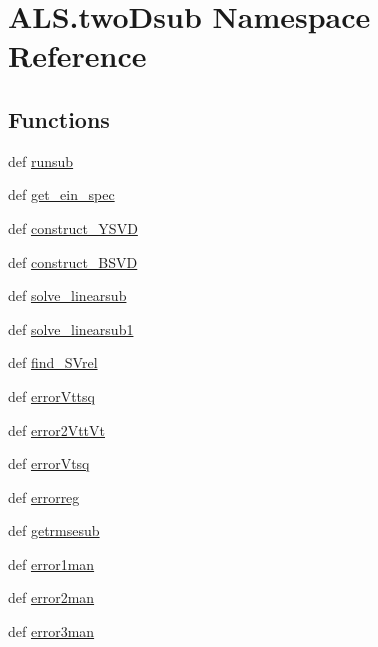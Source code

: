 \hypertarget{namespace_a_l_s_1_1two_dsub}{\section{A\+L\+S.\+two\+Dsub Namespace Reference}
\label{namespace_a_l_s_1_1two_dsub}
}
\subsection*{Functions}
\begin{DoxyCompactItemize}
\item 
def \hyperlink{namespace_a_l_s_1_1two_dsub_a2f5605fed0568b72d992d8e6cea524fb}{runsub}
\item 
def \hyperlink{namespace_a_l_s_1_1two_dsub_a55b1e2ba8a3076c1531b03c5b452df97}{get\+\_\+ein\+\_\+spec}
\item 
def \hyperlink{namespace_a_l_s_1_1two_dsub_a747a0fddd2d4946b8feb2dec4922339a}{construct\+\_\+\+Y\+S\+V\+D}
\item 
def \hyperlink{namespace_a_l_s_1_1two_dsub_a03942e98e6d55a7272ca42202b7fa2b1}{construct\+\_\+\+B\+S\+V\+D}
\item 
def \hyperlink{namespace_a_l_s_1_1two_dsub_a9829debd5a794619d0b28ef593e2fe25}{solve\+\_\+linearsub}
\item 
def \hyperlink{namespace_a_l_s_1_1two_dsub_a65f160f61d13cc56c8594c1c5a4007d2}{solve\+\_\+linearsub1}
\item 
def \hyperlink{namespace_a_l_s_1_1two_dsub_a682109e2526784365f949b8df590c60f}{find\+\_\+\+S\+Vrel}
\item 
def \hyperlink{namespace_a_l_s_1_1two_dsub_ac77dffbf53e91baeb63a5922e95ec5ba}{error\+Vttsq}
\item 
def \hyperlink{namespace_a_l_s_1_1two_dsub_a03a22979ea5d77d7edc063d0c16fa585}{error2\+Vtt\+Vt}
\item 
def \hyperlink{namespace_a_l_s_1_1two_dsub_a3d95d17c3194a00f16bb7e4d4df01b15}{error\+Vtsq}
\item 
def \hyperlink{namespace_a_l_s_1_1two_dsub_ab208a21968e43b6b1b917e9d6b2e6d9b}{errorreg}
\item 
def \hyperlink{namespace_a_l_s_1_1two_dsub_a16eed7722bb14b82c86a6ff3494d6aed}{getrmsesub}
\item 
def \hyperlink{namespace_a_l_s_1_1two_dsub_a523400ab33f417029f020bb9c42ab4f0}{error1man}
\item 
def \hyperlink{namespace_a_l_s_1_1two_dsub_ac3dc8b1063bbed67d87006543583dcfe}{error2man}
\item 
def \hyperlink{namespace_a_l_s_1_1two_dsub_ab97828fa10ad9500650b15b14cfe3a81}{error3man}
\end{DoxyCompactItemize}


